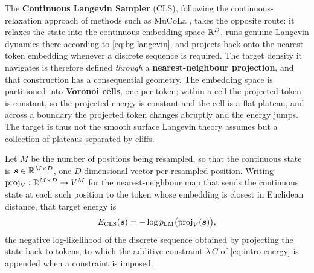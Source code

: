 The \textbf{Continuous Langevin Sampler} (CLS), following the continuous-relaxation approach of methods such as MuCoLa \citep{kumar2022gradient}, takes the opposite route: it relaxes the state into the continuous embedding space $\mathbb{R}^D$, runs genuine Langevin dynamics there according to \eqref{eq:bg-langevin}, and projects back onto the nearest token embedding whenever a discrete sequence is required. The target density it navigates is therefore defined \emph{through} a \textbf{nearest-neighbour projection}, and that construction has a consequential geometry. The embedding space is partitioned into \textbf{Voronoi cells}, one per token; within a cell the projected token is constant, so the projected energy is constant and the cell is a flat plateau, and across a boundary the projected token changes abruptly and the energy jumps. The target is thus not the smooth surface Langevin theory assumes but a collection of plateaus separated by cliffs.

Let $M$ be the number of positions being resampled, so that the continuous state is $\bm{s} \in \mathbb{R}^{M \times D}$, one $D$-dimensional vector per resampled position. Writing $\mathrm{proj}_V : \mathbb{R}^{M \times D} \to V^{M}$ for the nearest-neighbour map that sends the continuous state at each such position to the token whose embedding is closest in Euclidean distance, that target energy is
\begin{equation}
    E_{\text{CLS}}(\bm{s}) = -\log p_{\text{LM}}\bigl(\mathrm{proj}_V(\bm{s})\bigr),
    \label{eq:bg-cls-energy}
\end{equation}
the negative log-likelihood of the discrete sequence obtained by projecting the state back to tokens, to which the additive constraint $\lambda\, C$ of \eqref{eq:intro-energy} is appended when a constraint is imposed.

